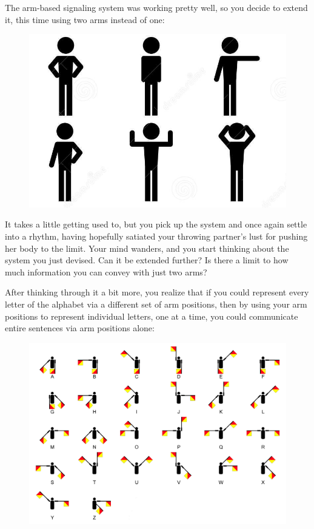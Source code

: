 \documentclass[UTF8]{book}
\begin{document}
\begin{CJK}{UTF8}{gbsn}
The arm-based signaling system was working pretty well, so you decide to extend it, this time using two arms instead of one:

\begin{figure}[H]
\centering
\includegraphics{stick-figure-six-positions-simplified}
\end{figure}

It takes a little getting used to, but you pick up the system and once again settle into a rhythm, having hopefully satiated your throwing partner's lust for pushing her body to the limit. Your mind wanders, and you start thinking about the system you just devised. Can it be extended further? Is there a limit to how much information you can convey with just two arms?

After thinking through it a bit more, you realize that if you could represent every letter of the alphabet via a different set of arm positions, then by using your arm positions to represent individual letters, one at a time, you could communicate entire sentences via arm positions alone:

\begin{figure}[H]
\centering
\includegraphics[width=0.9\linewidth]{semaphoreflags3}
\end{figure}


\end{CJK}
\end{document}
